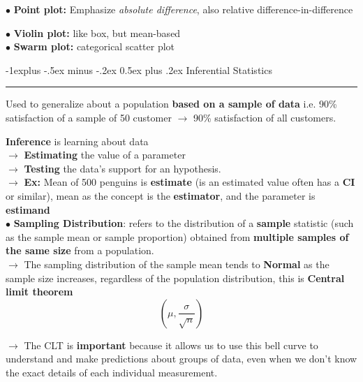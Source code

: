\documentclass[letterpaper, 10.5pt,landscape]{article}
\makeatletter
\renewcommand{\subsection}{\@startsection{subsection}{2}{0mm}%
                                {-1explus -.5ex minus -.2ex}%
                                {0.5ex plus .2ex}%
                                {\normalfont\normalsize\bfseries}}
\makeatother
\begin{document}
\begin{multicols*}{3}
$\bullet$ \textbf{Point plot: } Emphasize \textit{absolute difference}, also relative difference-in-difference \\
\vspace{2pt}




$\bullet$ \textbf{Violin plot: } like box, but mean-based \\
\vspace{2pt}
$\bullet$ \textbf{Swarm plot: } categorical scatter plot \\
\vspace{2pt}




\subsection{Inferential Statistics} {\color{teal}\hrule height 0.5pt} \smallskip

Used to generalize about a population \textbf{based on a sample of data} i.e. 90\% satisfaction of a sample of 50 customer $\rightarrow$ 90\% satisfaction of all customers. 
\vspace{2pt}

\textbf{Inference} is learning about data \\
$\rightarrow$  \textbf{Estimating} the value of a parameter \\
$\rightarrow$ \textbf{Testing} the data's support for an hypothesis. \\


$\rightarrow$ \textbf{Ex:}  Mean of 500 penguins is \textbf{estimate } (is an estimated value often has a \textbf{CI} or similar), mean as the concept is the \textbf{estimator}, and the parameter is \textbf{estimand} \\

$\bullet$ \textbf{Sampling Distribution}: refers to the distribution of a \textbf{sample} statistic (such as the sample mean or sample proportion) obtained from \textbf{multiple samples of the same size} from a population. \\
$\rightarrow$ The sampling distribution of the sample mean tends to \textbf{Normal} as the sample size increases, regardless of the population distribution, this is \textbf{Central limit theorem} \\ $$\boxed{\left( \mu, \frac{\sigma}{\sqrt{n}}\right)}$$


$\rightarrow$ The CLT is \textbf{important} because it allows us to use this bell curve to understand and make predictions about groups of data, even when we don't know the exact details of each individual measurement.



\end{multicols*}
\end{document}
